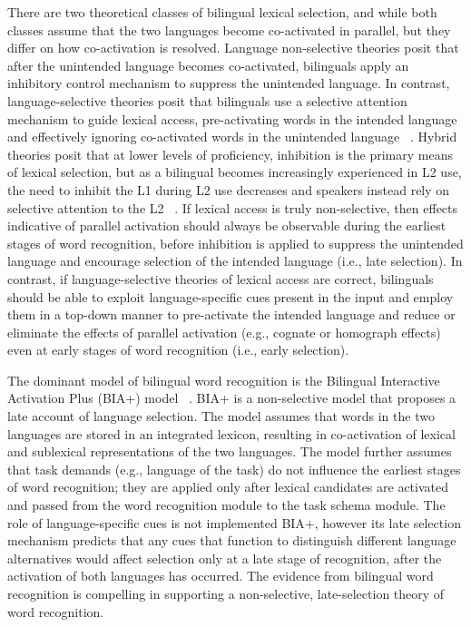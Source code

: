 There are two theoretical classes of bilingual lexical selection, and while both classes assume that the two languages become co-activated in parallel, but they differ on how co-activation is resolved. Language non-selective theories posit that after the unintended language becomes co-activated, bilinguals apply an inhibitory control mechanism to suppress the unintended language. In contrast, language-selective theories posit that bilinguals use a selective attention mechanism to guide lexical access, pre-activating words in the intended language and effectively ignoring co-activated words in the unintended language ~\citep{Costa1999, Finkbeiner2006, LaHeij2005}. Hybrid theories posit that at lower levels of proficiency, inhibition is the primary means of lexical selection, but as a bilingual becomes increasingly experienced in L2 use, the need to inhibit the L1 during L2 use decreases and speakers instead rely on selective attention to the L2 ~\citep{Costa2004}. If lexical access is truly non-selective, then effects indicative of parallel activation should always be observable during the earliest stages of word recognition, before inhibition is applied to suppress the unintended language and encourage selection of the intended language (i.e., late selection). In contrast, if language-selective theories of lexical access are correct, bilinguals should be able to exploit language-specific cues present in the input and employ them in a top-down manner to pre-activate the intended language and reduce or eliminate the effects of parallel activation (e.g., cognate or homograph effects) even at early stages of word recognition (i.e., early selection).

The dominant model of bilingual word recognition is the Bilingual Interactive Activation Plus (BIA+) model ~\citep{Dijkstra2002}. BIA+ is a non-selective model that proposes a late account of language selection. The model assumes that words in the two languages are stored in an integrated lexicon, resulting in co-activation of lexical and sublexical representations of the two languages. The model further assumes that task demands (e.g., language of the task) do not influence the earliest stages of word recognition; they are applied only after lexical candidates are activated and passed from the word recognition module to the task schema module. The role of language-specific cues is not implemented BIA+, however its late selection mechanism predicts that any cues that function to distinguish different language alternatives would affect selection only at a late stage of recognition, after the activation of both languages has occurred. The evidence from bilingual word recognition is compelling in supporting a non-selective, late-selection theory of word recognition. 

